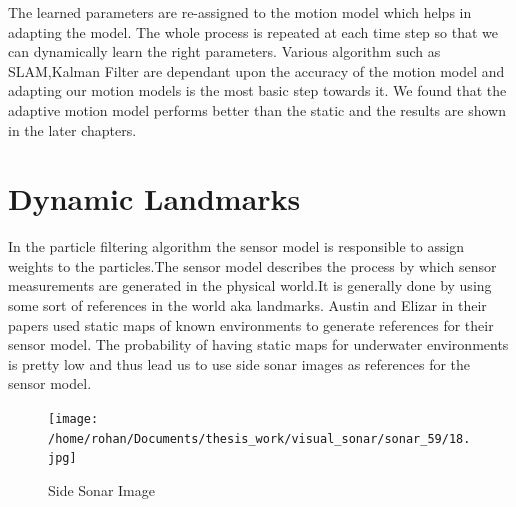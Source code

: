 \documentclass[12pt]{dalcsthesis}
\begin{document}
The learned parameters are re-assigned to the motion model which helps in adapting the model. The  whole
process is repeated at each time step so that we can dynamically learn the right parameters. Various algorithm such as SLAM,Kalman Filter are dependant upon the accuracy of the motion model and adapting our motion models is the most basic step towards it. We found that the adaptive motion model performs better than the static and the results are shown in the later chapters.






\section{Dynamic Landmarks}
In the particle filtering algorithm the sensor model is responsible to assign weights to the particles.The sensor model describes the process by which sensor measurements are generated in the physical world.It is generally done by using some sort of references in the world aka landmarks. Austin and Elizar in their papers used static maps of known environments to generate references for their sensor model.
The probability of having static maps for underwater environments is pretty low and thus lead us to use side sonar images as references for the sensor model.
\begin{figure}[hbtp]
\caption{Side Sonar Image}
\centering
\texttt{[image: /home/rohan/Documents/thesis\_work/visual\_sonar/sonar\_59/18.jpg]}
\end{figure}
\end{document}
